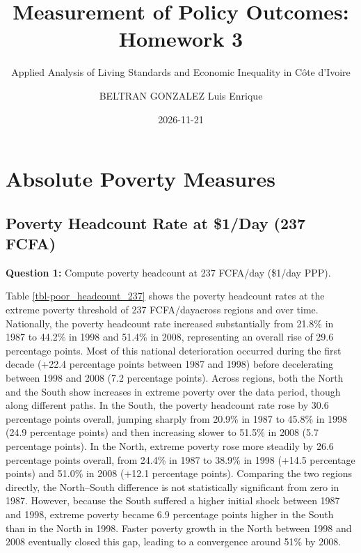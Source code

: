 \documentclass[
  letterpaper,
  DIV=11,
  numbers=noendperiod]{scrartcl}
\title{Measurement of Policy Outcomes: Homework 3}
\subtitle{Applied Analysis of Living Standards and Economic Inequality
in Côte d'Ivoire}
\author{BELTRAN GONZALEZ Luis Enrique}
\date{2026-11-21}
\begin{document}
\maketitle


\section{Absolute Poverty Measures}\label{absolute-poverty-measures}

\subsection{Poverty Headcount Rate at \$1/Day (237
FCFA)}\label{poverty-headcount-rate-at-1day-237-fcfa}

\textbf{Question 1:} Compute poverty headcount at 237 FCFA/day (\$1/day
PPP).

Table \ref{tbl-poor_headcount_237} shows the poverty headcount rates at
the extreme poverty threshold of 237 FCFA/dayacross regions and over
time. Nationally, the poverty headcount rate increased substantially
from 21.8\% in 1987 to 44.2\% in 1998 and 51.4\% in 2008, representing
an overall rise of 29.6 percentage points. Most of this national
deterioration occurred during the first decade (+22.4 percentage points
between 1987 and 1998) before decelerating between 1998 and 2008 (7.2
percentage points). Across regions, both the North and the South show
increases in extreme poverty over the data period, though along
different paths. In the South, the poverty headcount rate rose by 30.6
percentage points overall, jumping sharply from 20.9\% in 1987 to 45.8\%
in 1998 (24.9 percentage points) and then increasing slower to 51.5\% in
2008 (5.7 percentage points). In the North, extreme poverty rose more
steadily by 26.6 percentage points overall, from 24.4\% in 1987 to
38.9\% in 1998 (+14.5 percentage points) and 51.0\% in 2008 (+12.1
percentage points). Comparing the two regions directly, the North--South
difference is not statistically significant from zero in 1987. However,
because the South suffered a higher initial shock between 1987 and 1998,
extreme poverty became 6.9 percentage points higher in the South than in
the North in 1998. Faster poverty growth in the North between 1998 and
2008 eventually closed this gap, leading to a convergence around 51\% by
2008.
\end{document}
